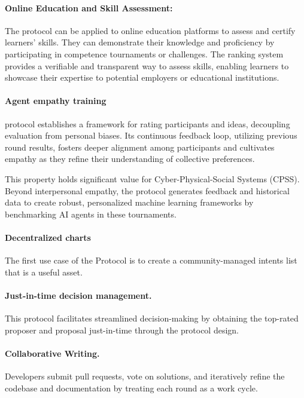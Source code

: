 \documentclass{article}
\begin{document}
\begin{CJK}{UTF8}{gbsn}
\begin{multicols}{2}
        \paragraph*{Online Education and Skill Assessment:} The protocol can be applied to online education platforms to assess and certify learners' skills. They can demonstrate their knowledge and proficiency by participating in competence tournaments or challenges. The ranking system provides a verifiable and transparent way to assess skills, enabling learners to showcase their expertise to potential employers or educational institutions.

        \paragraph{Agent empathy training} protocol establishes a framework for rating participants and ideas, decoupling evaluation from personal biases. Its continuous feedback loop, utilizing previous round results, fosters deeper alignment among participants and cultivates empathy as they refine their understanding of collective preferences.

        This property holds significant value for Cyber-Physical-Social Systems (CPSS)\cite{Fei2016}. Beyond interpersonal empathy, the protocol generates feedback and historical data to create robust, personalized machine learning frameworks by benchmarking AI agents in these tournaments.

        \paragraph{Decentralized charts} The first use case of the Protocol is to create a community-managed intents list that is a useful asset.

        \paragraph{Just-in-time decision management.} This protocol facilitates streamlined decision-making by obtaining the top-rated proposer and proposal just-in-time through the protocol design.

        \paragraph*{Collaborative Writing.} Developers submit pull requests, vote on solutions, and iteratively refine the codebase and documentation by treating each round as a work cycle.


\end{multicols}
\end{CJK}
\end{document}
